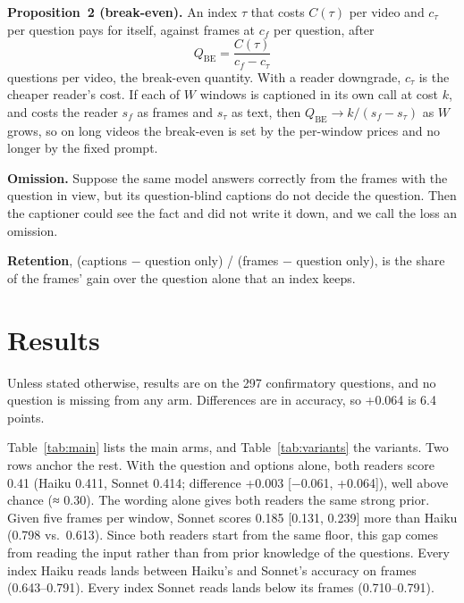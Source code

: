 \documentclass[11pt]{article}
\newcommand{\qbe}{\ensuremath{Q_{\mathrm{BE}}}}
\begin{document}
\textbf{Proposition~2 (break-even).} An index $\tau$ that costs $C(\tau)$ per video and $c_\tau$ per question pays for itself, against frames at $c_f$ per question, after
\[ \qbe = \frac{C(\tau)}{c_f - c_\tau} \]
questions per video, the break-even quantity. With a reader downgrade, $c_\tau$ is the cheaper reader's cost. If each of $W$ windows is captioned in its own call at cost $k$, and costs the reader $s_f$ as frames and $s_\tau$ as text, then $\qbe \to k / (s_f - s_\tau)$ as $W$ grows, so on long videos the break-even is set by the per-window prices and no longer by the fixed prompt.

\textbf{Omission.} Suppose the same model answers correctly from the frames with the question in view, but its question-blind captions do not decide the question. Then the captioner could see the fact and did not write it down, and we call the loss an omission.

\textbf{Retention}, (captions − question only) / (frames − question only), is the share of the frames' gain over the question alone that an index keeps.

\section{Results}
\label{sec:results}

Unless stated otherwise, results are on the 297 confirmatory questions, and no question is missing from any arm. Differences are in accuracy, so +0.064 is 6.4 points.

Table~\ref{tab:main} lists the main arms, and Table~\ref{tab:variants} the variants. Two rows anchor the rest. With the question and options alone, both readers score 0.41 (Haiku 0.411, Sonnet 0.414; difference +0.003 [−0.061, +0.064]), well above chance (≈ 0.30). The wording alone gives both readers the same strong prior. Given five frames per window, Sonnet scores 0.185 [0.131, 0.239] more than Haiku (0.798 vs.\ 0.613). Since both readers start from the same floor, this gap comes from reading the input rather than from prior knowledge of the questions. Every index Haiku reads lands between Haiku's and Sonnet's accuracy on frames (0.643--0.791). Every index Sonnet reads lands below its frames (0.710--0.791).
\end{document}
